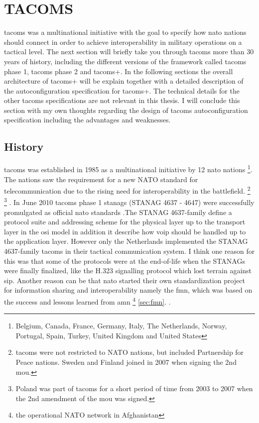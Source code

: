 \section{TACOMS}
\gls{tacoms} was a multinational initiative with the goal to specify how \gls{nato} nations should connect in order to achieve interoperability in military operations on a tactical level. 
The next section will briefly take you through \gls{tacoms} more than 30 years of history, including the different versions of the framework called \gls{tacoms} phase 1, \gls{tacoms} phase 2 and \gls{tacoms}+. In the following sections the overall architecture of \gls{tacoms}+ will be explain together with a detailed description of the autoconfiguration specification for \gls{tacoms}+. The technical details for the other \gls{tacoms} specifications are not relevant in this thesis. I will conclude this section with my own thoughts regarding the design of \gls{tacoms} autoconfiguration specification including the advantages and weaknesses. 
\subsection{History}
\gls{tacoms} was established in 1985 as a multinational initiative by 12 \gls{nato} nations \footnote{Belgium, Canada, France, Germany, Italy, The Netherlands, Norway, Portugal, Spain, Turkey, United Kingdom and United States}. The nations saw the requirement for a new NATO standard for telecommunication due to the rising need for interoperability in the battlefield. \footnote{\gls{tacoms} were not restricted to NATO nations, but included Partnership for Peace nations. Sweden and Finland joined in 2007 when signing the 2nd \gls{mou}.} \footnote{Poland was part of \gls{tacoms} for a short period of time from 2003 to 2007 when the 2nd amendment of the \gls{mou} was signed.} \cite{https://www.tacoms.org/pages/history.aspx}. In June 2010 \gls{tacoms} phase 1  \gls{stanag}s (STANAG 4637 - 4647) were successfully promulgated as official \gls{nato} standards \cite{https://www.tacoms.org/pages/about.aspx}.The STANAG 4637-family define a protocol suite and addressing scheme for the physical layer up to the transport layer in the \gls{osi} model in addition it describe how \gls{voip} should be handled up to the application layer. However only the Netherlands implemented the STANAG 4637-family \gls{tacoms} in their tactical communication system. I think one reason for this was that some of the protocols were at the end-of-life when the STANAGs were finally finalized, like the H.323 signalling protocol which lost terrain against \gls{sip}. Another reason can be that \gls{nato} started their own standardization project for information sharing and interoperability namely the \gls{fmn}, which was based on the success and lessons learned from \gls{amn} \footnote{the operational NATO network in Afghanistan} \ref{sec:fmn}. . 

